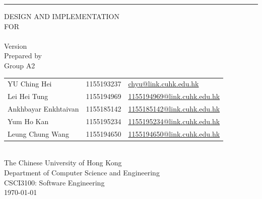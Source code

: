 \documentclass[a4paper, 11pt]{scrreprt}
\begin{document}

\begin{titlepage}
    \begin{flushright}
        \rule{\textwidth}{5pt}\vskip1cm
        \begin{bfseries}
            \Huge{DESIGN AND IMPLEMENTATION\\ FOR}\\
            \vspace{1.6cm}
            \projectname\\
            \vspace{1.6cm}
            \LARGE{Version \myversion}\\
            \vspace{1.6cm}
            Prepared by\\
            Group A2\\
            \Large{
                \begin{tabularx}{\textwidth}{l l >{\raggedleft\arraybackslash}X}
                    YU Ching Hei & 1155193237 & \href{mailto:chyu@link.cuhk.edu.hk}{chyu@link.cuhk.edu.hk}\\
                    Lei Hei Tung & 1155194969 & \href{mailto:1155194969@link.cuhk.edu.hk}{1155194969@link.cuhk.edu.hk}\\
                    Ankhbayar Enkhtaivan & 1155185142 & \href{mailto:1155185142@link.cuhk.edu.hk}{1155185142@link.cuhk.edu.hk}\\
                    Yum Ho Kan & 1155195234 & \href{mailto:1155195234@link.cuhk.edu.hk}{1155195234@link.cuhk.edu.hk}\\
                    Leung Chung Wang & 1155194650 & \href{mailto:1155194650@link.cuhk.edu.hk}{1155194650@link.cuhk.edu.hk}\\
                \end{tabularx}
            }\\
            \vspace{1.6cm}
            The Chinese University of Hong Kong\\
            Department of Computer Science and Engineering\\
            CSCI3100: Software Engineering\\
            \vspace{1.6cm}
            \today\\
        \end{bfseries}
    \end{flushright}
\end{titlepage}
\end{document}

